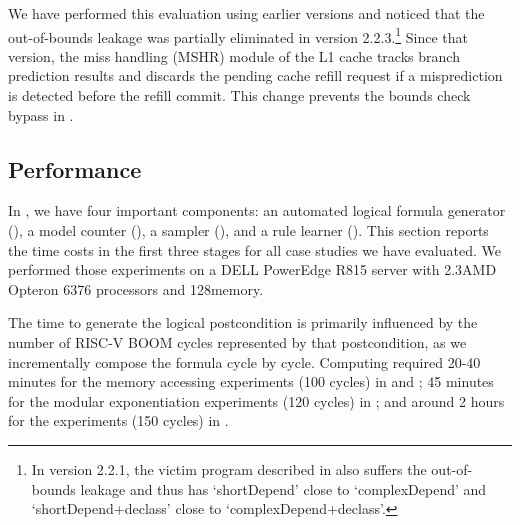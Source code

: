 We have performed this evaluation using earlier \boom versions and
noticed that the out-of-bounds leakage was partially eliminated in version
2.2.3.\footnote{In \boom version 2.2.1, the victim program described
  in  also suffers the
  out-of-bounds leakage and thus has `shortDepend' close to
  `complexDepend' and `shortDepend+declass' close to
  `complexDepend+declass'.} Since that version, the miss handling
(MSHR) module of the L1 cache tracks branch prediction results and
discards the pending cache refill request if a misprediction is
detected before the refill commit. This change prevents the bounds
check bypass in .

\subsection{Performance}
\label{dinome:sec:exp:performance}
In \thirdsysname, we have four important components: an automated logical
formula generator (), a model counter
(), a sampler (),
and a rule learner ().  This section
reports the time costs in the first three stages for all case studies
we have evaluated. We performed those experiments on a DELL PowerEdge
R815 server with 2.3\gigahertz AMD Opteron 6376 processors and
128\gigabytes memory.

The time to generate the logical postcondition is primarily influenced
by the number of RISC-V BOOM cycles represented by that postcondition,
as we incrementally compose the formula cycle by cycle.  Computing
\postcondition{\proc}{} required 20-40 minutes for the memory
accessing experiments (100 cycles) in  and
; 45 minutes for the modular
exponentiation experiments (120 cycles) in ;
and around 2 hours for the \spectre experiments (150 cycles) in
.

